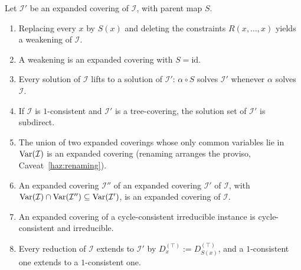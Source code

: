 \begin{proposition}\label{prop:covering-basics}
Let $\mathcal I'$ be an expanded covering of $\mathcal I$, with parent map $S$.
\begin{enumerate}\alphlabels\tightlist
\item Replacing every $x$ by $S(x)$ and deleting the constraints
  $R(x,\dots,x)$ yields a weakening of $\mathcal I$.
\item A weakening is an expanded covering with $S=\mathrm{id}$.
\item Every solution of $\mathcal I$ lifts to a solution of $\mathcal I'$:
  $\alpha\circ S$ solves $\mathcal I'$ whenever $\alpha$ solves $\mathcal I$.
\item If $\mathcal I$ is $1$-consistent and $\mathcal I'$ is a tree-covering,
  the solution set of $\mathcal I'$ is subdirect.
\item The union of two expanded coverings whose only common variables lie in
  $\operatorname{Var}(\mathcal I)$ is an expanded covering (renaming arranges the proviso,
  Caveat~\ref{haz:renaming}).
\item An expanded covering $\mathcal I''$ of an expanded covering
  $\mathcal I'$ of $\mathcal I$, with
  $\operatorname{Var}(\mathcal I)\cap\operatorname{Var}(\mathcal I'')\subseteq\operatorname{Var}(\mathcal I')$, is an
  expanded covering of $\mathcal I$.
\item An expanded covering of a cycle-consistent irreducible instance is
  cycle-consistent and irreducible.
\item Every reduction of $\mathcal I$ extends to $\mathcal I'$ by
  $D^{(\top)}_{x}:=D^{(\top)}_{S(x)}$, and a $1$-consistent one extends to a
  $1$-consistent one.
\end{enumerate}
\end{proposition}

